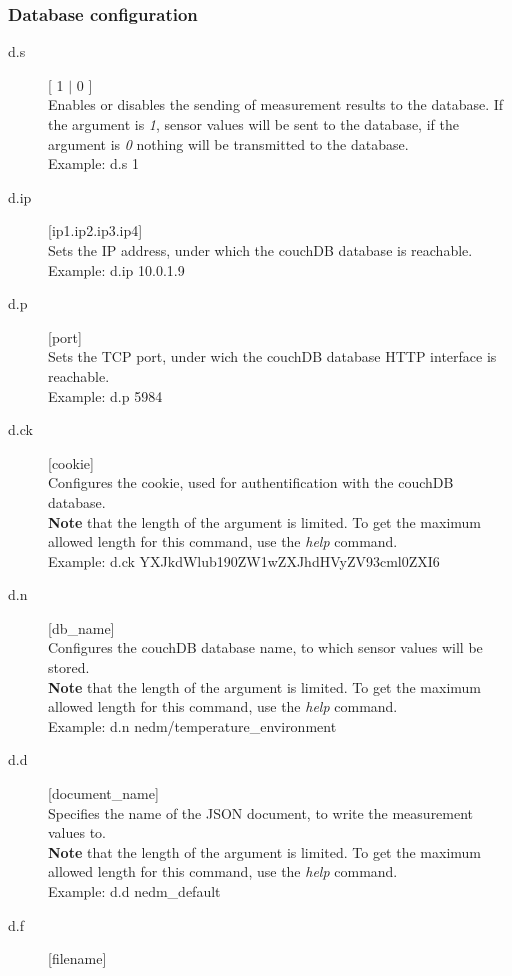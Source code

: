 \documentclass[a4paper]{scrreprt}
\begin{document}
\subsubsection{Database configuration}
\begin{description}
  \item[d.s] [ 1 $|$ 0 ]\\
    Enables or disables the sending of measurement results to the database. If the
    argument is \emph{1}, sensor values will be sent to the database, if the argument
    is \emph{0} nothing will be transmitted to the database.\\
    Example: d.s 1
  \item[d.ip] [ip1.ip2.ip3.ip4]\\
    Sets the IP address, under which the couchDB database is reachable.\\
    Example: d.ip 10.0.1.9
  \item[d.p] [port]\\
    Sets the TCP port, under wich the couchDB database HTTP interface is reachable.\\
    Example: d.p 5984
  \item[d.ck] [cookie]\\
    Configures the cookie, used for authentification with the couchDB database.\\
    \textbf{Note} that the length of the argument is limited. To get the maximum allowed
    length for this command, use the \emph{help} command.\\
    Example: d.ck YXJkdWlub190ZW1wZXJhdHVyZV93cml0ZXI6
  \item[d.n] [db\_name]\\
    Configures the couchDB database name, to which sensor values will be stored.\\
    \textbf{Note} that the length of the argument is limited. To get the maximum allowed
    length for this command, use the \emph{help} command.\\
    Example: d.n nedm/temperature\_environment
  \item[d.d] [document\_name]\\
    Specifies the name of the JSON document, to write the measurement values to.\\
    \textbf{Note} that the length of the argument is limited. To get the maximum allowed
    length for this command, use the \emph{help} command.\\
    Example: d.d nedm\_default
  \item[d.f] [filename]\\

\end{description}
\end{document}
